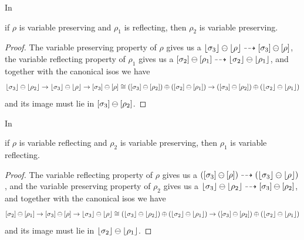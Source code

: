 \begin{lemma}\label{lem:vpres-vrefl-cancl}
    In 
    if $\rho$ is variable preserving and $\rho_1$ is reflecting, then $\rho_2$ is variable preserving.
\end{lemma}
\begin{proof}
The variable preserving property of $\rho$ gives us a $\lfloor\sigma_3\rfloor \ominus \lfloor\rho\rfloor \dashrightarrow [\sigma_3] \ominus [\rho]$,
the variable reflecting property of $\rho_1$ gives us a $[\sigma_2] \ominus [\rho_1] \dashrightarrow \lfloor\sigma_2\rfloor \ominus \lfloor\rho_1\rfloor$,
and together with the canonical isos we have
\[ 
    \lfloor\sigma_3\rfloor \ominus \lfloor\rho_2\rfloor \to
        \lfloor\sigma_3\rfloor \ominus \lfloor\rho\rfloor \to
            [\sigma_3] \ominus [\rho] \cong
                ([\sigma_3] \ominus [\rho_2]) \oplus ([\sigma_2] \ominus [\rho_1]) \to
                    ([\sigma_3] \ominus [\rho_2]) \oplus (\lfloor\sigma_2\rfloor \ominus \lfloor\rho_1\rfloor)
\]
and its image must lie in $[\sigma_3] \ominus [\rho_2]$.
\end{proof}

\begin{lemma}\label{lem:vrefl-vpres-cancl}
    In 
    if $\rho$ is variable reflecting and $\rho_2$ is variable preserving, then $\rho_1$ is variable reflecting.
\end{lemma}
\begin{proof}
    The variable reflecting property of $\rho$ gives us a $([\sigma_3] \ominus [\rho]) \dashrightarrow (\lfloor\sigma_3\rfloor \ominus \lfloor\rho\rfloor)$,
    and the variable preserving property of $\rho_2$ gives us a $\lfloor\sigma_3\rfloor \ominus \lfloor\rho_2\rfloor \dashrightarrow [\sigma_3] \ominus [\rho_2]$,
    and together with the canonical isos we have
    \[ 
        [\sigma_2] \ominus [\rho_1] \to 
            [\sigma_3] \ominus [\rho] \to 
                \lfloor\sigma_3\rfloor \ominus \lfloor\rho\rfloor \cong
                    (\lfloor\sigma_3\rfloor \ominus \lfloor\rho_2\rfloor) \oplus (\lfloor\sigma_2\rfloor \ominus \lfloor\rho_1\rfloor) \to
                        ([\sigma_3] \ominus [\rho_2]) \oplus (\lfloor\sigma_2\rfloor \ominus \lfloor\rho_1\rfloor)
    \]
    and its image must lie in $\lfloor\sigma_2\rfloor \ominus \lfloor\rho_1\rfloor$.
\end{proof}

